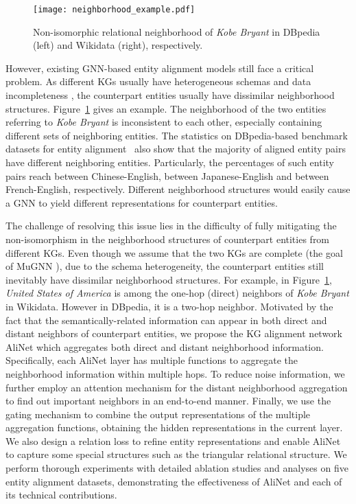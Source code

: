 \documentclass[letterpaper]{article} \usepackage{aaai20}  \usepackage{times}  \usepackage{helvet} \usepackage{courier}  \usepackage[hyphens]{url}  \usepackage{graphicx} \urlstyle{rm} \def\UrlFont{\rm}  \frenchspacing  \setlength{\pdfpagewidth}{8.5in}  \setlength{\pdfpageheight}{11in}  \usepackage{amsmath}
\begin{document}
\begin{figure}[!t]
	\center
	\texttt{[image: neighborhood\_example.pdf]}
	\caption{Non-isomorphic relational neighborhood of \textit{Kobe Bryant} in DBpedia (left) and Wikidata (right), respectively.}
	\label{fig:example}
\end{figure}

However, existing GNN-based entity alignment models still face a critical problem. As different KGs usually have heterogeneous schemas and data incompleteness \cite{KGIdentification}, the counterpart entities usually have dissimilar neighborhood structures. Figure~\ref{fig:example} gives an example. The neighborhood of the two entities referring to \textit{Kobe Bryant} is inconsistent to each other, especially containing different sets of neighboring entities. The statistics on DBpedia-based benchmark datasets for entity alignment~\cite{JAPE} also show that the majority of aligned entity pairs have different neighboring entities. Particularly, the percentages of such entity pairs reach  between Chinese-English,  between Japanese-English and  between French-English, respectively. Different neighborhood structures would easily cause a GNN to yield different representations for counterpart entities. 

The challenge of resolving this issue lies in the difficulty of fully mitigating the non-isomorphism in the neighborhood structures of counterpart entities from different KGs. Even though we assume that the two KGs are complete (the goal of MuGNN \cite{MuGNN}), due to the schema heterogeneity, the counterpart entities still inevitably have dissimilar neighborhood structures. For example, in Figure~\ref{fig:example}, \textit{United States of America} is among the one-hop (direct) neighbors of \textit{Kobe Bryant} in Wikidata. However in DBpedia, it is a two-hop neighbor. Motivated by the fact that the semantically-related information can appear in both direct and distant neighbors of counterpart entities, we propose the KG alignment network AliNet which aggregates both direct and distant neighborhood information. Specifically, each AliNet layer has multiple functions to aggregate the neighborhood information within multiple hops. To reduce noise information, we further employ an attention mechanism for the distant neighborhood aggregation to find out important neighbors in an end-to-end manner. Finally, we use the gating mechanism to combine the output representations of the multiple aggregation functions, obtaining the hidden representations in the current layer. We also design a relation loss to refine entity representations and enable AliNet to capture some special structures such as the triangular relational structure. We perform thorough experiments with detailed ablation studies and analyses on five entity alignment datasets, demonstrating the effectiveness of AliNet and each of its technical contributions.
\end{document}
